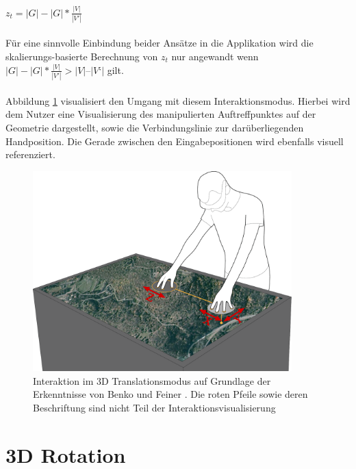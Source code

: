 \\\\
$z_t = |G| - |G| * \frac{|V|}{|V'|}$
\\\\
Für eine sinnvolle Einbindung beider Ansätze in die Applikation wird die skalierungs-basierte Berechnung von $z_t$ nur angewandt wenn $|G| - |G| * \frac{|V|}{|V'|} > |V| – |V‘|$ gilt. 
\\\\
Abbildung \ref{fig:baloon_interaction} visualisiert den Umgang mit diesem Interaktionsmodus. Hierbei wird dem Nutzer eine Visualisierung des manipulierten Auftreffpunktes auf der Geometrie dargestellt, sowie die Verbindungslinie zur darüberliegenden Handposition. Die Gerade zwischen den Eingabepositionen wird ebenfalls visuell referenziert.

\begin{figure}
	\begin{center}
		\includegraphics[width=10cm]{img/baloon_interaction.pdf}
	\end{center}
	\caption{Interaktion im 3D Translationsmodus auf Grundlage der Erkenntnisse von Benko und Feiner \cite{benko:2007}. Die roten Pfeile sowie deren Beschriftung sind nicht Teil der Interaktionsvisualisierung}
	\label{fig:baloon_interaction}
\end{figure}

\section{3D Rotation}
\label{sec:3d_rotation}

